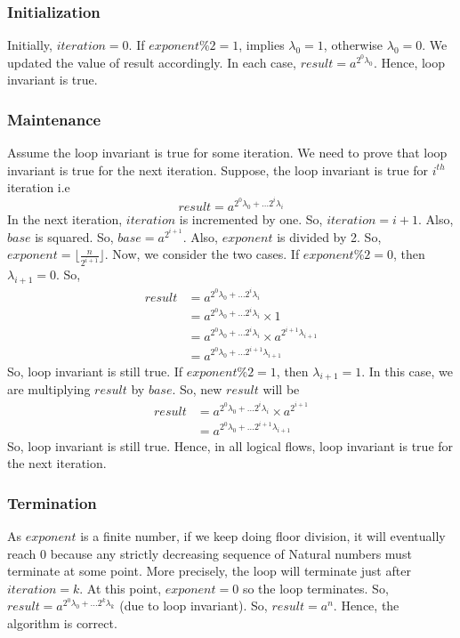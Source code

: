 \documentclass[12pt]{article}
\begin{document}
\subsubsection*{Initialization}
Initially, $iteration = 0$. If $exponent\%2 = 1$, implies $\lambda_0 = 1$, otherwise $\lambda_0 = 0$. We updated the value of result accordingly. In each case, $result = a^{2^0\lambda_0}$. Hence, loop invariant is true.

\subsubsection*{Maintenance}
Assume the loop invariant is true for some iteration. We need to prove that loop invariant is true for the next iteration. Suppose, the loop invariant is true for $i^{th}$ iteration i.e $$result = a^{2^0\lambda_0 + \ldots 2^{i}\lambda_{i}}$$
In the next iteration, $iteration$ is incremented by one. So, $iteration = i + 1$. Also, $base$ is squared. So, $base = a^{2^{i+1}}$. Also, $exponent$ is divided by 2. So, $exponent = \lfloor \frac{n}{2^{i+1}} \rfloor$. Now, we consider the two cases. If $exponent\%2 = 0$, then $\lambda_{i+1} = 0$. So,
\begin{align*}
    result &= a^{2^0\lambda_0 + \ldots 2^{i}\lambda_{i}} \\ 
            &= a^{2^0\lambda_0 + \ldots 2^{i}\lambda_{i}} \times 1 \\ 
            &= a^{2^0\lambda_0 + \ldots 2^{i}\lambda_{i}} \times a^{2^{i+1} \lambda_{i+1}} \\
            &= a^{2^0\lambda_0 + \ldots 2^{i+1}\lambda_{i+1}}
\end{align*}
So, loop invariant is still true. If $exponent\%2 = 1$, then $\lambda_{i+1} = 1$. In this case, we are multiplying $result$ by $base$. So, new $result$ will be
\begin{align*}
    result &= a^{2^0\lambda_0 + \ldots 2^{i}\lambda_{i}} \times a^{2^{i+1}} \\
        &= a^{2^0\lambda_0 + \ldots 2^{i+1}\lambda_{i+1}}
\end{align*}
So, loop invariant is still true. Hence, in all logical flows, loop invariant is true for the next iteration.

\subsubsection*{Termination}
As $exponent$ is a finite number, if we keep doing floor division, it will eventually reach $0$ because any strictly decreasing sequence of Natural numbers must terminate at some point. More precisely, the loop will terminate just after $iteration = k$. At this point, $exponent = 0$ so the loop terminates. So, $result = a^{2^0\lambda_0 + \ldots 2^{k}\lambda_{k}}$ (due to loop invariant). So, $result = a^n$. Hence, the algorithm is correct.
\end{document}
